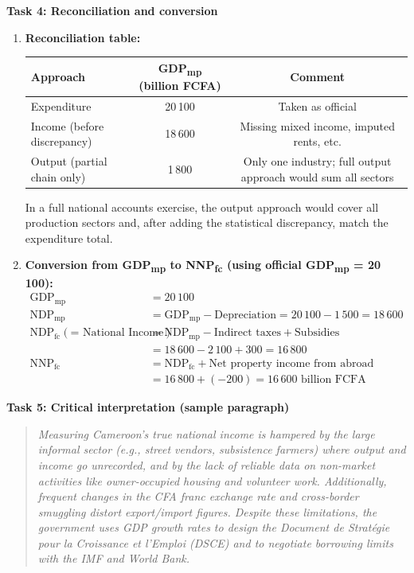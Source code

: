 \documentclass[11pt]{article}
\begin{document}
\textbf{Task 4: Reconciliation and conversion}
\begin{enumerate}
    \item \textbf{Reconciliation table:}
    \begin{center}
    \begin{tabular}{|l|c|c|}
    \hline
    \rowcolor{popblueL}
    \textbf{Approach} & \textbf{GDP\textsubscript{mp} (billion FCFA)} & \textbf{Comment} \\
    \hline
    Expenditure & 20\,100 & Taken as official \\
    Income (before discrepancy) & 18\,600 & Missing mixed income, imputed rents, etc. \\
    Output (partial chain only) & 1\,800 & Only one industry; full output approach would sum all sectors \\
    \hline
    \end{tabular}
    \end{center}
    In a full national accounts exercise, the output approach would cover all production sectors and, after adding the statistical discrepancy, match the expenditure total.

    \item \textbf{Conversion from GDP\textsubscript{mp} to NNP\textsubscript{fc} (using official GDP\textsubscript{mp} = 20\,100):}
    \begin{align*}
    \text{GDP}_{\text{mp}} &= 20\,100 \\
    \text{NDP}_{\text{mp}} &= \text{GDP}_{\text{mp}} - \text{Depreciation} = 20\,100 - 1\,500 = 18\,600 \\
    \text{NDP}_{\text{fc}} (\text{= National Income}) &= \text{NDP}_{\text{mp}} - \text{Indirect taxes} + \text{Subsidies} \\
    &= 18\,600 - 2\,100 + 300 = 16\,800 \\
    \text{NNP}_{\text{fc}} &= \text{NDP}_{\text{fc}} + \text{Net property income from abroad} \\
    &= 16\,800 + (-200) = \boxed{16\,600 \text{ billion FCFA}}
    \end{align*}
\end{enumerate}

\textbf{Task 5: Critical interpretation (sample paragraph)}
\begin{quote}
\textit{Measuring Cameroon's true national income is hampered by the large informal sector (e.g., street vendors, subsistence farmers) where output and income go unrecorded, and by the lack of reliable data on non-market activities like owner-occupied housing and volunteer work. Additionally, frequent changes in the CFA franc exchange rate and cross-border smuggling distort export/import figures. Despite these limitations, the government uses GDP growth rates to design the \emph{Document de Stratégie pour la Croissance et l'Emploi (DSCE)} and to negotiate borrowing limits with the IMF and World Bank.}
\end{quote}
\end{document}
